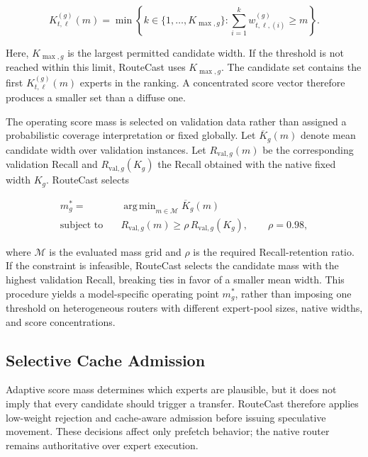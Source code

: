 \documentclass[conference]{IEEEtran}
\DeclareMathOperator*{\argmin}{arg\,min}
\begin{document}
\begin{equation}
K_{t,\ell}^{(g)}(m)
=
\min
\left\{
k\in\{1,\ldots,K_{\max,g}\}:
\sum_{i=1}^{k}
w_{t,\ell,(i)}^{(g)}
\geq m
\right\}.
\label{eq:adaptive-width}
\end{equation}

Here, \(K_{\max,g}\) is the largest permitted candidate width. If the threshold
is not reached within this limit, RouteCast uses \(K_{\max,g}\). The candidate
set contains the first \(K_{t,\ell}^{(g)}(m)\) experts in the ranking. A
concentrated score vector therefore produces a smaller set than a diffuse one.

The operating score mass is selected on validation data rather than assigned
a probabilistic coverage interpretation or fixed globally. Let
\(\overline{K}_g(m)\) denote mean candidate width over validation instances.
Let \(R_{\mathrm{val},g}(m)\) be the corresponding validation Recall and
\(R_{\mathrm{val},g}(K_g)\) the Recall obtained with the native fixed width
\(K_g\). RouteCast selects

\begin{equation}
\begin{aligned}
m_g^*
={}&
\argmin_{m\in\mathcal{M}}
\overline{K}_{g}(m) \\
\text{subject to}\quad
&
R_{\mathrm{val},g}(m)
\geq
\rho\,
R_{\mathrm{val},g}(K_g),
\qquad
\rho=0.98,
\end{aligned}
\label{eq:mass-selection}
\end{equation}

where \(\mathcal{M}\) is the evaluated mass grid and \(\rho\) is the required
Recall-retention ratio. If the constraint is infeasible, RouteCast selects the
candidate mass with the highest validation Recall, breaking ties in favor of a
smaller mean width. This procedure yields a
model-specific operating point \(m_g^*\), rather than imposing one threshold
on heterogeneous routers with different expert-pool sizes, native widths, and
score concentrations.


\subsection{Selective Cache Admission}

Adaptive score mass determines which experts are plausible, but it does not imply
that every candidate should trigger a transfer. RouteCast therefore applies
low-weight rejection and cache-aware admission before issuing speculative
movement. These decisions affect only prefetch behavior; the native router
remains authoritative over expert execution.
\end{document}
